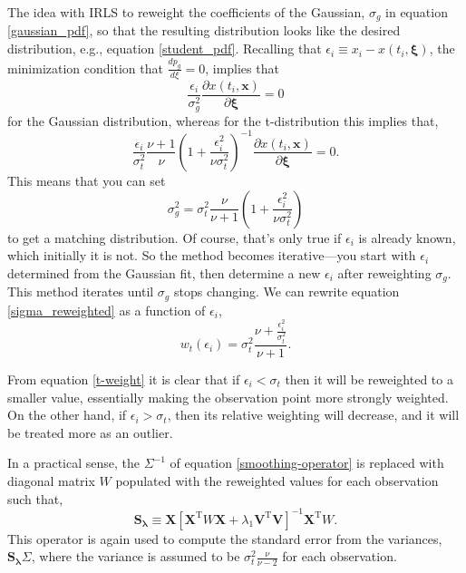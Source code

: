 \documentclass[10pt,journal]{IEEEtran}
\begin{document}
The idea with IRLS to reweight the coefficients of the Gaussian, $\sigma_g$ in equation \ref{gaussian_pdf}, so that the resulting distribution looks like the desired distribution, e.g., equation \ref{student_pdf}. Recalling that $\epsilon_i \equiv x_i - x(t_i,\mathbf{\xi})$, the minimization condition that $\frac{d p_g}{d\xi}=0$, implies that
\begin{equation}
\frac{\epsilon_i}{\sigma_g^2} \frac{\partial x(t_i,\mathbf{x})}{\partial \mathbf{\xi}} = 0
\end{equation}
for the Gaussian distribution, whereas for the t-distribution this implies that,
\begin{equation}
 \frac{\epsilon_i}{\sigma_t^2} \frac{\nu+1}{\nu} \left( 1 + \frac{\epsilon_i^2}{\nu \sigma_t^2} \right)^{-1}  \frac{\partial x(t_i,\mathbf{x})}{\partial \mathbf{\xi}}  = 0.
\end{equation}
This means that you can set
\begin{equation}
\sigma_g^2 =   \sigma_t^2 \frac{\nu}{\nu+1} \left( 1 + \frac{\epsilon_i^2}{\nu \sigma_t^2} \right)
\label{sigma_reweighted}
\end{equation}
to get a matching distribution. Of course, that's only true if $\epsilon_i$ is already known, which initially it is not. So the method becomes iterative---you start with $\epsilon_i$ determined from the Gaussian fit, then determine a new $\epsilon_i$ after reweighting $\sigma_g$. This method iterates until $\sigma_g$ stops changing. We can rewrite equation \ref{sigma_reweighted} as a function of $\epsilon_i$,
\begin{equation}
\label{t-weight}
w_t(\epsilon_i) = \sigma_t^2 \frac{\nu  + \frac{\epsilon_i^2}{\sigma_t^2}}{\nu+1}.
\end{equation}

From equation \ref{t-weight} it is clear that if $\epsilon_i < \sigma_t$ then it will be reweighted to a smaller value, essentially making the observation point more strongly weighted. On the other hand, if $\epsilon_i > \sigma_t$, then its relative weighting will decrease, and it will be treated more as an outlier.

In a practical sense, the $\Sigma^{-1}$ of equation \ref{smoothing-operator} is replaced with diagonal matrix $W$ populated with the reweighted values for each observation such that,
\begin{equation}
\label{general-smoothing-operator}
\mathbf{S_\lambda} \equiv \mathbf{X} \left[ \mathbf{X}^{\textrm{T}} W \mathbf{X} + \lambda_1 \mathbf{V}^{\textrm{T}} \mathbf{V} \right]^{-1} \mathbf{X}^{\textrm{T}} W.
\end{equation}
This operator is again used to compute the standard error from the variances,  $\mathbf{S_\lambda} \Sigma$, where the variance is assumed to be $\sigma_t^2 \frac{\nu}{\nu-2}$ for each observation.
\end{document}
